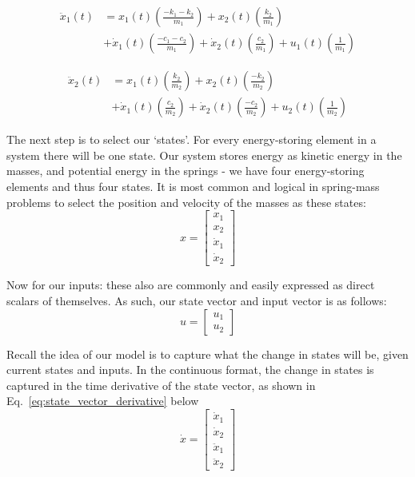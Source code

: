 \begin{equation}
    \begin{split}
        \ddot{x}_1(t) &= x_1(t)\left(\frac{-k_1-k_2}{m_1}\right) + x_2(t)\left(\frac{k_2}{m_1}\right) \\ 
        &+ \dot{x}_1(t)\left(\frac{-c_1-c_2}{m_1}\right)+\dot{x}_2(t)\left(\frac{c_2}{m_1}\right)+u_1(t)\left(\frac{1}{m_1}\right)
    \end{split}
    \label{eq:x1_eom}
\end{equation}

\begin{equation} 
    \begin{split}
        \ddot{x}_2(t) &= x_1(t)\left(\frac{k_2}{m_2}\right) + x_2(t)\left(\frac{-k_2}{m_2}\right) \\
        &+ \dot{x}_1(t)\left(\frac{c_2}{m_2}\right)+\dot{x}_2(t)\left(\frac{-c_2}{m_2}\right)+u_2(t)\left(\frac{1}{m_2}\right)
    \end{split}
    \label{eq:x2_eom}
\end{equation}

The next step is to select our `states'. For every energy-storing element in a system there will be one state. Our system stores energy as kinetic energy in the masses, and potential energy in the springs - we have four energy-storing elements and thus four states. It is most common and logical in spring-mass problems to select the position and velocity of the masses as these states:
\begin{equation} 
    x =
    \begin{bmatrix}
        x_1 \\ x_2 \\ \dot x_1 \\ \dot x_2
    \end{bmatrix}
    \label{eq:state_vector}
\end{equation}

Now for our inputs: these also are commonly and easily expressed as direct scalars of themselves. As such, our state vector and input vector is as follows:
\begin{equation} 
    u =
    \begin{bmatrix}
        u_1 \\ u_2
    \end{bmatrix}
    \label{eq:input_vector}
\end{equation}

Recall the idea of our model is to capture what the change in states will be, given current states and inputs. In the continuous format, the change in states is captured in the time derivative of the state vector, as shown in Eq.~\ref{eq:state_vector_derivative} below
\begin{equation} 
    \dot x =
    \begin{bmatrix}
        \dot x_1 \\ \dot x_2 \\ \ddot x_1 \\ \ddot x_2
    \end{bmatrix}
    \label{eq:state_vector_derivative}
\end{equation}

